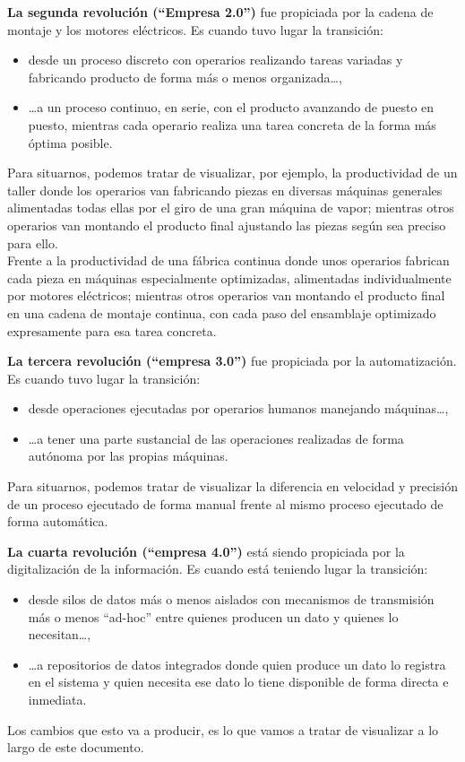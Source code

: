 \documentclass[spanish,12pt,a4paper,final,oneside]{book}
\begin{document}
\textbf{La segunda revolución (``Empresa 2.0'')} fue propiciada por la cadena de montaje y los motores eléctricos. Es cuando tuvo lugar la transición:
\begin{itemize}
\item desde un proceso discreto con operarios realizando tareas variadas y fabricando producto de forma más o menos organizada\ldots,
\item \ldots a un proceso continuo, en serie, con el producto avanzando de puesto en puesto, mientras cada operario realiza una tarea concreta de la forma más óptima posible.
\end{itemize}
Para situarnos, podemos tratar de visualizar, por ejemplo, la productividad de un taller donde los operarios van fabricando piezas en diversas máquinas generales alimentadas todas ellas por el giro de una gran máquina de vapor; mientras otros operarios van montando el producto final ajustando las piezas según sea preciso para ello. 
\\Frente a la productividad de una fábrica continua donde unos operarios fabrican cada pieza en máquinas especialmente optimizadas, alimentadas individualmente por motores eléctricos; mientras otros operarios van montando el producto final en una cadena de montaje continua, con cada paso del ensamblaje optimizado expresamente para esa tarea concreta.


\vspace{2cm}

\textbf{La tercera revolución (``empresa 3.0'')} fue propiciada por la automatización. Es cuando tuvo lugar la transición:
\begin{itemize}
\item desde operaciones ejecutadas por operarios humanos manejando máquinas\ldots,
\item \ldots a tener una parte sustancial de las operaciones realizadas de forma autónoma por las propias máquinas.
\end{itemize}
Para situarnos, podemos tratar de visualizar la diferencia en velocidad y precisión de un proceso ejecutado de forma manual frente al mismo proceso ejecutado de forma automática.

\vspace{2cm}

\textbf{La cuarta revolución (``empresa 4.0'')} está siendo propiciada por la digitalización de la información. Es cuando está teniendo lugar la transición:
\begin{itemize}
\item desde silos de datos más o menos aislados con mecanismos de transmisión más o menos ``ad-hoc'' entre quienes producen un dato y quienes lo necesitan\ldots,
\item \ldots a repositorios de datos integrados donde quien produce un dato lo registra en el sistema y quien necesita ese dato lo tiene disponible de forma directa e inmediata.
\end{itemize}
Los cambios que esto va a producir, es lo que vamos a tratar de visualizar a lo largo de este documento.
\end{document}
